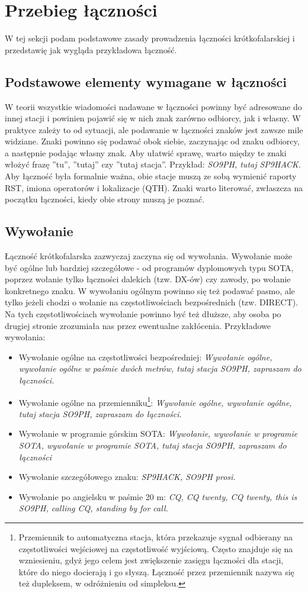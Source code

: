 \documentclass[a4paper,11pt]{article}
\begin{document}
\section{Przebieg łączności}
W tej sekcji podam podstawowe zasady prowadzenia łączności krótkofalarskiej i przedstawię jak wygląda przykładowa łączność.
\subsection{Podstawowe elementy wymagane w łączności}
W teorii wszystkie wiadomości nadawane w łączności powinny być adresowane do innej stacji i powinien pojawić się w nich znak zarówno odbiorcy, jak i własny. W praktyce zależy to od sytuacji, ale podawanie w łączności znaków jest zawsze mile widziane. Znaki powinno się podawać obok siebie, zaczynając od znaku odbiorcy, a następnie podając własny znak. Aby ułatwić sprawę, warto między te znaki włożyć frazę ''tu'', ''tutaj'' czy ''tutaj stacja''. Przykład: \textit{SO9PH, tutaj SP9HACK}. Aby łączność była formalnie ważna, obie stacje muszą ze sobą wymienić raporty RST, imiona operatorów i lokalizacje (QTH). Znaki warto literować, zwłaszcza na początku łączności, kiedy obie strony muszą je poznać.
\subsection{Wywołanie}
Łączność krótkofalarska zazwyczaj zaczyna się od wywołania. Wywołanie może być ogólne lub bardziej szczegółowe - od programów dyplomowych typu SOTA, poprzez wołanie tylko łączności dalekich (tzw. DX-ów) czy zawody, po wołanie konkretnego znaku. W wywołaniu ogólnym powinno się też podawać pasmo, ale tylko jeżeli chodzi o wołanie na częstotliwościach bezpośrednich (tzw. DIRECT). Na tych częstotliwościach wywołanie powinno być też dłuższe, aby osoba po drugiej stronie zrozumiała nas przez ewentualne zakłócenia. Przykładowe wywołania:
\begin{itemize}
\item Wywołanie ogólne na częstotliwości bezpośredniej: \textit{Wywołanie ogólne, wywołanie ogólne w paśmie dwóch metrów, tutaj stacja SO9PH, zapraszam do łączności.}
\item Wywołanie ogólne na przemienniku\footnote{Przemiennik to automatyczna stacja, która przekazuje sygnał odbierany na częstotliwości wejściowej na częstotliwość wyjściową. Często znajduje się na wzniesieniu, gdyż jego celem jest zwiększenie zasięgu łączności dla stacji, które do niego docierają i go słyszą. Łączność przez przemiennik nazywa się też dupleksem, w odróżnieniu od simpleksu.}: \textit{Wywołanie ogólne, wywołanie ogólne, tutaj stacja SO9PH, zapraszam do łączności.}
\item Wywołanie w programie górskim SOTA: \textit{Wywołanie, wywołanie w programie SOTA, wywołanie w programie SOTA, tutaj stacja SO9PH, zapraszam do łączności}
\item Wywołanie szczegółowego znaku: \textit{SP9HACK, SO9PH prosi.}
\item Wywołanie po angielsku w paśmie 20 m: \textit{CQ, CQ twenty, CQ twenty, this is SO9PH, calling CQ, standing by for call.}
\end{itemize}
\end{document}
